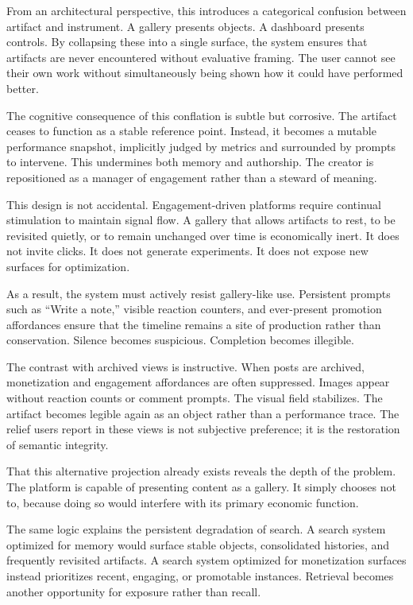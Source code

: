 \documentclass[11pt,oneside]{article}
\begin{document}
From an architectural perspective, this introduces a categorical confusion between artifact and instrument. A gallery presents objects. A dashboard presents controls. By collapsing these into a single surface, the system ensures that artifacts are never encountered without evaluative framing. The user cannot see their own work without simultaneously being shown how it could have performed better.

The cognitive consequence of this conflation is subtle but corrosive. The artifact ceases to function as a stable reference point. Instead, it becomes a mutable performance snapshot, implicitly judged by metrics and surrounded by prompts to intervene. This undermines both memory and authorship. The creator is repositioned as a manager of engagement rather than a steward of meaning.

This design is not accidental. Engagement-driven platforms require continual stimulation to maintain signal flow. A gallery that allows artifacts to rest, to be revisited quietly, or to remain unchanged over time is economically inert. It does not invite clicks. It does not generate experiments. It does not expose new surfaces for optimization.

As a result, the system must actively resist gallery-like use. Persistent prompts such as “Write a note,” visible reaction counters, and ever-present promotion affordances ensure that the timeline remains a site of production rather than conservation. Silence becomes suspicious. Completion becomes illegible.

The contrast with archived views is instructive. When posts are archived, monetization and engagement affordances are often suppressed. Images appear without reaction counts or comment prompts. The visual field stabilizes. The artifact becomes legible again as an object rather than a performance trace. The relief users report in these views is not subjective preference; it is the restoration of semantic integrity.

That this alternative projection already exists reveals the depth of the problem. The platform is capable of presenting content as a gallery. It simply chooses not to, because doing so would interfere with its primary economic function.

The same logic explains the persistent degradation of search. A search system optimized for memory would surface stable objects, consolidated histories, and frequently revisited artifacts. A search system optimized for monetization surfaces instead prioritizes recent, engaging, or promotable instances. Retrieval becomes another opportunity for exposure rather than recall.
\end{document}
